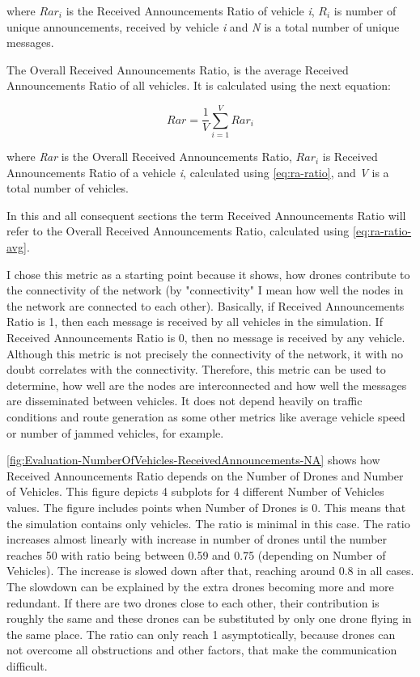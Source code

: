 \documentclass[]{nsm-thesis}
\begin{document}
where $Rar_{i}$ is the Received Announcements Ratio of vehicle \emph{i}, $R_{i}$ is number of unique announcements, received by vehicle \emph{i} and \emph{N} is a total number of unique messages.

The Overall Received Announcements Ratio, is the average Received Announcements Ratio of all vehicles. It is calculated using the next equation:

\begin{equation}\label{eq:ra-ratio-avg}
Rar = \frac{1}{V}\sum_{i=1}^{V} Rar_{i}
\end{equation}

where \emph{Rar} is the Overall Received Announcements Ratio, $Rar_{i}$ is Received Announcements Ratio of a vehicle \emph{i}, calculated using \cref{eq:ra-ratio}, and \emph{V} is a total number of vehicles.

In this and all consequent sections the term Received Announcements Ratio will refer to the Overall Received Announcements Ratio, calculated using \cref{eq:ra-ratio-avg}. 

I chose this metric as a starting point because it shows, how drones contribute to the connectivity of the network (by "connectivity" I mean how well the nodes in the network are connected to each other). Basically, if Received Announcements Ratio is 1, then each message is received by all vehicles in the simulation. If Received Announcements Ratio is 0, then no message is received by any vehicle. Although this metric is not precisely the connectivity of the network, it with no doubt correlates with the connectivity. Therefore, this metric can be used to determine, how well are the nodes are interconnected and how well the messages are disseminated between vehicles. It does not depend heavily on traffic conditions and route generation as some other metrics like average vehicle speed or number of jammed vehicles, for example.

\cref{fig:Evaluation-NumberOfVehicles-ReceivedAnnouncements-NA} shows how Received Announcements Ratio depends on the Number of Drones and Number of Vehicles. This figure depicts 4 subplots for 4 different Number of Vehicles values. The figure includes points when Number of Drones is 0. This means that the simulation contains only vehicles. The ratio is minimal in this case. The ratio increases almost linearly with increase in number of drones until the number reaches 50 with ratio being between 0.59 and 0.75 (depending on Number of Vehicles). The increase is slowed down after that, reaching around 0.8 in all cases. The slowdown can be explained by the extra drones becoming more and more redundant. If there are two drones close to each other, their contribution is roughly the same and these drones can be substituted by only one drone flying in the same place. The ratio can only reach 1 asymptotically, because drones can not overcome all obstructions and other factors, that make the communication difficult.
\end{document}
